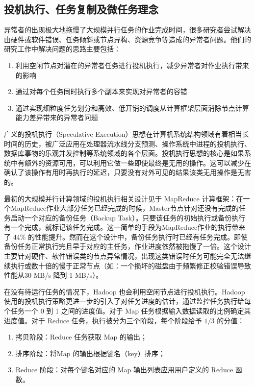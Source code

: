 \subsection{投机执行、任务复制及微任务理念}
异常者的出现极大地拖慢了大规模并行任务的作业完成时间，很多研究者尝试解决由硬件或软件错误、任务倾斜或节点异构、资源竞争等造成的异常者问题。他们的研究工作中解决问题的思路主要包括：
\begin{enumerate}
\item 利用空闲节点对潜在的异常者任务进行投机执行，减少异常者对作业执行带来的影响
\item 通过对每个任务同时执行多个副本来实现对异常者的容错
\item 通过实现细粒度任务划分和高效、低开销的调度从计算框架层面消除节点计算能力差异带来的异常者问题
\end{enumerate}

广义的投机执行（Speculative Execution）思想在计算机系统结构领域有着相当长时间的历史，被广泛应用在处理器流水线分支预测、操作系统中进程的投机执行、数据库事物的乐观并发控制等系统领域的各个层面。投机执行思想的核心是如果系统中有额外的资源可用，可以利用它做一些即使最终是无用的操作。这可以减少在确认了该操作有用时再执行的延迟，只要没有对外可见的结果该类无用操作是无害的。

最初的大规模并行计算领域的投机执行相关设计见于 MapReduce 计算框架：在一个MapReduce作业大部分任务已经完成的时候，Master节点针对还没有完成的任务启动一个对应的备份任务（Backup Task）。只要该任务的初始执行或备份执行有一个完成，就标记该任务完成。这一简单的手段为MapReduce作业的执行带来了 44\% 的性能提升\cite{dean}。然而在这个设计中，备份任务执行时已经有任务完成。即使备份任务正常执行完且早于对应的主任务，作业进度依然被拖慢了一倍。这个设计主要针对硬件、软件错误类的节点异常情况，出现这类错误时任务可能完全无法继续执行或数十倍的慢于正常节点（如：一个损坏的磁盘由于频繁修正校验错误导致性能从30 MB/s 降到 1 MB/s）。

在没有待运行任务的情况下，Hadoop 也会利用空闲节点进行投机执行。Hadoop 使用的投机执行策略更进一步的引入了对任务进度的估计，通过监控任务执行给每个任务一个 0 到 1 之间的进度值。对于 Map 任务根据输入数据读取的比例确定其进度值。对于 Reduce 任务，执行被分为三个阶段，每个阶段给予 $1/3$ 的分值：
\begin{enumerate}
\item 拷贝阶段：Reduce 任务获取 Map 的输出；
\item 排序阶段：将Map 的输出根据键名（key）排序；
\item Reduce 阶段：对每个键名对应的 Map 输出列表应用用户定义的 Reduce 函数。
\end{enumerate}

